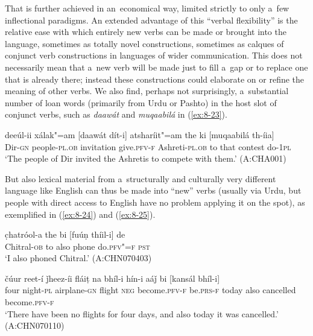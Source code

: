 That is further achieved in an~economical way, limited strictly to only a~few inflectional paradigms. An extended advantage of this ``verbal flexibility'' is the relative ease with which entirely new verbs can be made or brought into the language, sometimes as totally novel constructions, sometimes as calques of conjunct verb constructions in languages of wider communication. This does not necessarily mean that a~new verb will be made just to fill a~gap or to replace one that is already there; instead these constructions could elaborate on or refine the meaning of other verbs. We also find, perhaps not surprisingly, a~substantial number of loan words (primarily from Urdu or Pashto) in the host slot of conjunct verbs, such as \textit{daawát} and \textit{muqaabilá} in (\ref{ex:8-23}).

\begin{exe}
\ex
\label{ex:8-23}
\gll deeúl-ii xálak"=am [daawát dít-i] atsharíit"=am the ki [muqaabilá th-íia] \\
Dir-\textsc{gn} people-\textsc{pl.ob} invitation give.\textsc{pfv-f} Ashreti-\textsc{pl.ob} to that contest do-\textsc{1pl} \\
\glt `The people of Dir invited the Ashretis to compete with them.' (A:CHA001)
\end{exe}

But also lexical material from a~structurally and culturally very different language like English can thus be made into ``new'' verbs (usually via Urdu, but people with direct access to English have no problem applying it on the spot), as exemplified in (\ref{ex:8-24}) and (\ref{ex:8-25}).

\begin{exe}
\ex
\label{ex:8-24}
\gll c̣hatróol-a the bi [fuúṇ thíil-i] de \\
Chitral-\textsc{ob} to also phone do.\textsc{pfv"=f} \textsc{pst} \\
\glt `I also phoned Chitral.' (A:CHN070403)
\end{exe}
\begin{exe}
\ex
\label{ex:8-25}
\gll čúur reet-í ǰheez-íi fláiṭ na bhíl-i  hín-i aáǰ bi [kansál
  bhíl-i]  \\
four night-\textsc{pl} airplane-\textsc{gn} flight \textsc{neg} become.\textsc{pfv-f}  be.\textsc{prs-f} today also cancelled become.\textsc{pfv-f}  \\
\glt `There have been no flights for four days, and also today it was cancelled.' (A:CHN070110)
\end{exe}

